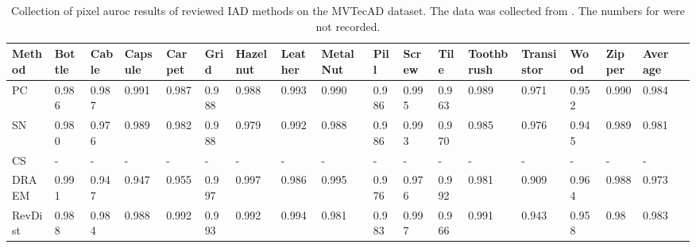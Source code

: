 \begin{table}[htbp]
    \tiny
    \centering
    \begin{tabularx}{\textwidth}{|X|X|X|X|X|X|X|X|X|X|X|X|X|X|X|X|X|X|}%
        \hline
        \textbf{Method} & \textbf{Bottle} & \textbf{Cable} & \textbf{Capsule} & \textbf{Carpet} & \textbf{Grid} & \textbf{Hazelnut} & \textbf{Leather} & \textbf{Metal Nut} & \textbf{Pill} & \textbf{Screw} & \textbf{Tile} & \textbf{Toothbrush} & \textbf{Transistor} & \textbf{Wood} & \textbf{Zipper} & \textbf{Average} \\
        \hline
        PC \cite{patchCore2022} & 0.986 & 0.987 & 0.991 & 0.987 & 0.988 & 0.988 & 0.993 & 0.990 & 0.986 & 0.995 & 0.963 & 0.989 & 0.971 & 0.952 & 0.990 & 0.984 \\
        \hline
        SN \cite{liu2023simplenet} & 0.980 & 0.976 & 0.989 & 0.982 & 0.988 & 0.979 & 0.992 & 0.988 & 0.986 & 0.993 & 0.970 & 0.985 & 0.976 & 0.945 & 0.989 & 0.981 \\
        \hline
        CS \cite{csflow2022} & - & - & - & - & - & - & - & - & - & - & - & - & - & - & - & - \\
        \hline
        DRAEM \cite{Zavrtanik_2021DRAEM} & 0.991 & 0.947 & 0.947 & 0.955 & 0.997 & 0.997 & 0.986 & 0.995 & 0.976 & 0.976 & 0.992 & 0.981 & 0.909 & 0.964 & 0.988 & 0.973 \\
        \hline
        RevDist \cite{revdist2023} & 0.988 & 0.984 & 0.988 & 0.992 & 0.993 & 0.992 & 0.994 & 0.981 & 0.983 & 0.997 & 0.966 & 0.991 & 0.943 & 0.958 & 0.98 & 0.983 \\
        \hline
    \end{tabularx}
    \caption{Collection of pixel auroc results of reviewed IAD methods on the MVTecAD \cite{MVTEC_Bergmann_2021} dataset. The data was collected from \cite{liu2024deep} \cite{liu2023simplenet} \cite{Zavrtanik_2021DRAEM} \cite{revdist2023}. The numbers for \cite{csflow2022} were not recorded.}
    \label{tab:pixelaurocmvtec}
\end{table}






